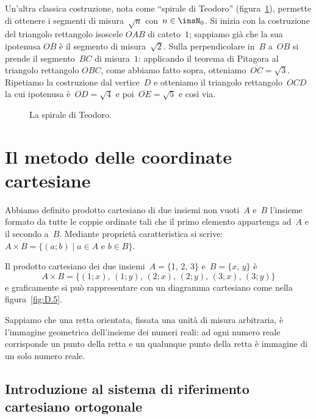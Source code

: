 Un'altra classica costruzione, nota come ``spirale di Teodoro'' (figura~\ref{fig:D.4}), permette di ottenere i segmenti di misura~$\sqrt{n}$ con~$n\in \insN_{0}$.
Si inizia con la costruzione del triangolo rettangolo isoscele $OAB$ di cateto~$1$; sappiamo già che la sua ipotenusa $OB$ è il segmento
di misura~$\sqrt{2}$. Sulla perpendicolare in~$B$ a~$OB$ si prende il segmento~$BC$ di misura~$1$:
applicando il teorema di Pitagora al triangolo rettangolo $OBC$, come abbiamo fatto sopra, otteniamo~$\overline{OC}=\sqrt{3}$.
Ripetiamo la costruzione dal vertice~$D$ e otteniamo il triangolo rettangolo~$OCD$ la cui ipotenusa è~$\overline{OD}=\sqrt{4}$
e poi~$\overline{OE}=\sqrt{5}$ e così via.
\begin{figure}[t]
 \centering\vspace{-15ex}
 \caption{La spirale di Teodoro.}\label{fig:D.4}
\end{figure}

\ovalbox{\risolvii \ref{ese:D.15}, \ref{ese:D.16}, \ref{ese:D.17}}

\section{Il metodo delle coordinate cartesiane}\label{sect:coordinate_cartesiane}

Abbiamo definito prodotto cartesiano di due insiemi non vuoti~$A$ e~$B$ l'insieme formato da tutte
le coppie ordinate tali che il primo elemento appartenga ad~$A$ e il secondo a~$B$. Mediante proprietà caratteristica
si scrive:~$A\times B=\{(a;b)\mid a\in A\text{ e }b\in B\}$.

\begin{exrig}
 \begin{esempio}
 \label{ex:D.11}
Il prodotto cartesiano dei due insiemi~$A=\{$1, 2, 3$\}$ e~$B=\{x$, $y\}$ è
\[A \times B = \{(1;x)\text{, }(1;y)\text{, }(2;x)\text{, }(2;y)\text{, }(3;x)\text{, }(3;y)\}\]
e graficamente si può rappresentare con un diagramma cartesiano come nella figura~\ref{fig:D.5}.

Sappiamo che una retta orientata, fissata una unità di misura arbitraria, è l'immagine geometrica dell'insieme dei numeri reali:
ad ogni numero reale corrisponde un punto della retta e un qualunque punto della retta è immagine di un solo numero reale.
 \end{esempio}
\end{exrig}

\subsection{Introduzione al sistema di riferimento cartesiano ortogonale}

